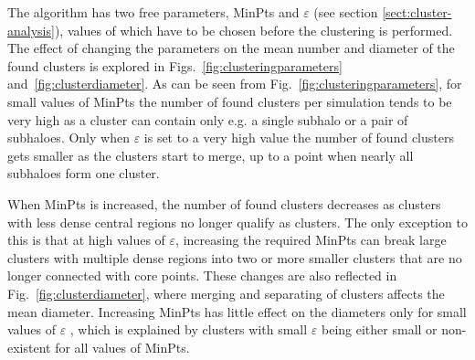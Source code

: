 \documentclass[english, oneside]{HYgradu}
\begin{document}

The algorithm has two free parameters, MinPts and $\varepsilon$ (see section \ref{sect:cluster-analysis}), values of which have to be chosen before the clustering is performed. The effect of changing the parameters on the mean number and diameter of the found clusters is explored in Figs.~\ref{fig:clusteringparameters} and~\ref{fig:clusterdiameter}. As can be seen from Fig.~\ref{fig:clusteringparameters}, for small values of MinPts the number of found clusters per simulation tends to be very high as a cluster can contain only e.g. a single subhalo or a pair of subhaloes. Only when $\varepsilon$ is set to a very high value the number of found clusters gets smaller as the clusters start to merge, up to a point when nearly all subhaloes form one cluster.

When MinPts is increased, the number of found clusters decreases as clusters with less dense central regions no longer qualify as clusters. The only exception to this is that at high values of $\varepsilon$, increasing the required MinPts can break large clusters with multiple dense regions into two or more smaller clusters that are no longer connected with core points. These changes are also reflected in Fig.~\ref{fig:clusterdiameter}, where merging and separating of clusters affects the mean diameter. Increasing MinPts has little effect on the diameters only for small values of $\varepsilon$ , which is explained by clusters with small $\varepsilon$ being either small or non-existent for all values of MinPts.
\end{document}
